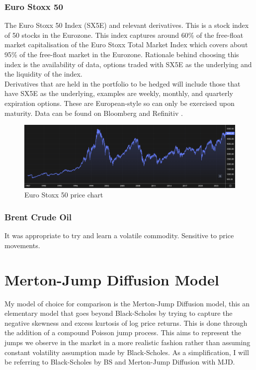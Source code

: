 \documentclass[12pt]{article}
\numberwithin{equation}{section}
\begin{document}
\subsubsection{Euro Stoxx 50}
The Euro Stoxx 50 Index (SX5E) and relevant derivatives. This is a stock index of 50 stocks in the Eurozone. 
This index captures around 60\% of the free-float market capitalisation of the 
Euro Stoxx Total Market Index which covers about 95\% of the free-float market 
in the Eurozone\autocite{a2021_euro}. Rationale behind choosing this index is the availability of data,
options traded with SX5E as the underlying and the liquidity of the index.
\\
Derivatives that are held in the portfolio to be hedged will include those that 
have SX5E as the underlying, examples are weekly, monthly, and quarterly
expiration options. These are European-style so can only be exercised upon 
maturity. Data can be found on Bloomberg\autocite{bloomberg_2023_bloomberg} and Refinitiv
\autocite{lseg}.
\begin{figure}[h]
    \centering
    \includegraphics[scale=0.35]{sx5e.png}
    \caption{Euro Stoxx 50 price chart}
\end{figure}

\subsubsection{Brent Crude Oil}
It was appropriate to try and learn a volatile commodity. Sensitive to price 
movements.

\clearpage

\section{Merton-Jump Diffusion Model}
My model of choice for comparison is the Merton-Jump Diffusion model, this an 
elementary model that goes beyond Black-Scholes by trying to capture the negative
skewness and excess kurtosis of log price returns. This is done through the 
addition of a compound Poisson jump process. This aims to represent the jumps 
we observe in the market in a more realistic fashion rather than assuming constant 
volatility assumption made by Black-Scholes. As a simplification, I will be referring 
to Black-Scholes by BS and Merton-Jump Diffusion with MJD.
\end{document}
